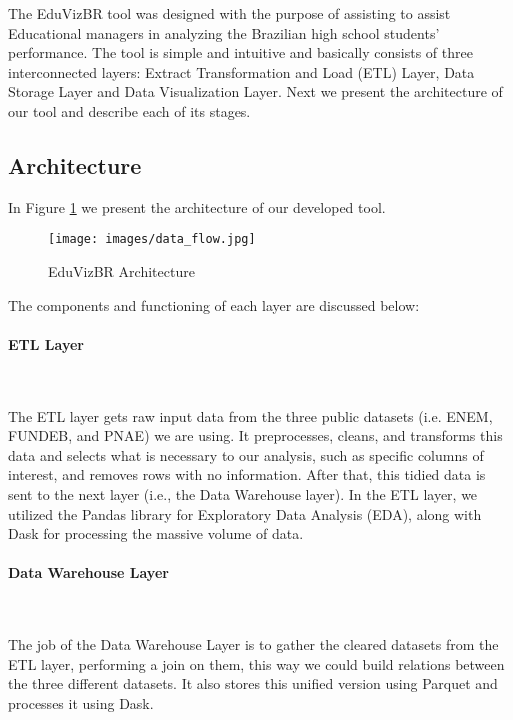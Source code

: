 \documentclass[12pt]{article}
\begin{document}
The EduVizBR tool was designed with the purpose of assisting to assist Educational managers in analyzing the Brazilian high school students' performance. The tool is simple and intuitive and basically consists of three interconnected layers: Extract Transformation and Load (ETL) Layer, Data Storage Layer and Data Visualization Layer.  Next we present the architecture of our tool and describe each of its stages.




\subsection{Architecture}

In Figure \ref{data_flow} we present the architecture of our developed tool.

\begin{figure}[h!] 
\centering
\texttt{[image: images/data\_flow.jpg]}
\caption{EduVizBR Architecture} 
\label{data_flow}
\end{figure}

The components and functioning of each layer are discussed below:


\paragraph{ETL Layer}\

The ETL layer gets raw input data from the three public datasets (i.e. ENEM, FUNDEB, and PNAE) we are using. It preprocesses, cleans, and transforms this data and selects what is necessary to our analysis, such as specific columns of interest, and removes rows with no information. After that, this tidied data is sent to the next layer (i.e., the Data Warehouse layer). In the ETL layer, we utilized the Pandas library for Exploratory Data Analysis (EDA), along with Dask for processing the massive volume of data.

\paragraph{Data Warehouse Layer}\

The job of the Data Warehouse Layer is to gather the cleared datasets from the ETL layer, performing a join on them, this way we could build relations between the three different datasets.  It also stores this unified version using Parquet and processes it using Dask.
\end{document}
